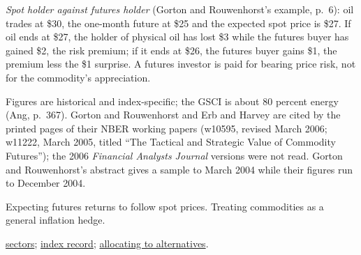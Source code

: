 \begin{qfdefinition}
 \emph{Spot holder against futures holder} (Gorton and Rouwenhorst's example, p.~6): oil trades at \$30, the one-month future at \$25 and the expected spot price is \$27. If oil ends at \$27, the holder of physical oil has lost \$3 while the futures buyer has gained \$2, the risk premium; if it ends at \$26, the futures buyer gains \$1, the premium less the \$1 surprise. A futures investor is paid for bearing price risk, not for the commodity's appreciation.

 Figures are historical and index-specific; the GSCI is about 80 percent energy (Ang, p.~367). Gorton and Rouwenhorst and Erb and Harvey are cited by the printed pages of their NBER working papers (w10595, revised March 2006; w11222, March 2005, titled ``The Tactical and Strategic Value of Commodity Futures''); the 2006 \emph{Financial Analysts Journal} versions were not read. Gorton and Rouwenhorst's abstract gives a sample to March 2004 while their figures run to December 2004.

 Expecting futures returns to follow spot prices. Treating commodities as a general inflation hedge.

 \hyperref[meth:commodity-sectors-participants]{sectors}; \hyperref[def:commodity-indices-risk-return]{index record}; \hyperref[meth:alternatives-allocation-approaches]{allocating to alternatives}.

\end{qfdefinition}

